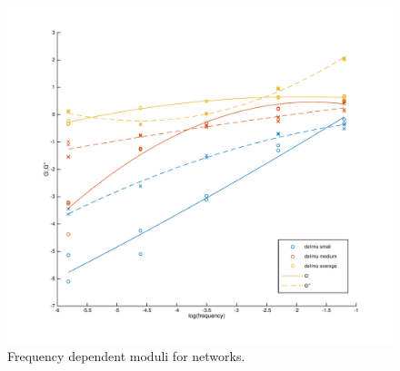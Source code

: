 \documentclass[pre,preprint]{revtex4-1}
\begin{document}
\begin{figure}[h!]
\centering
\includegraphics[width=\hsize]{frequency_dep}
\caption{\label{fig:freq} Frequency dependent moduli for networks.}
\end{figure}
\end{document}
